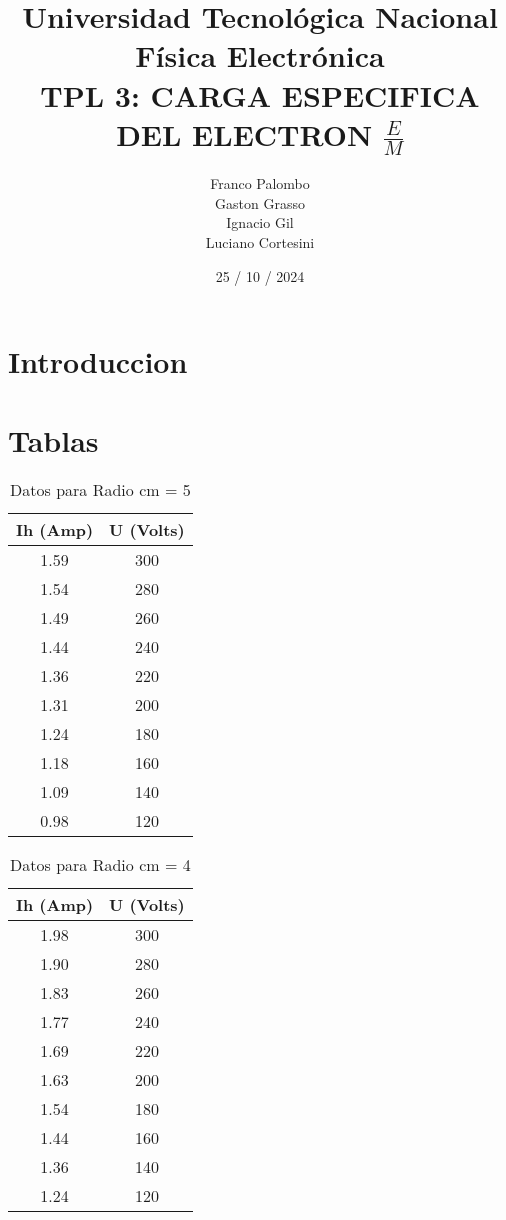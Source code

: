 \documentclass[a4paper,12pt]{report}
\title{
  \fontsize{25}{0}\selectfont Universidad Tecnológica Nacional \\
  \fontsize{22}{30}\selectfont Física Electrónica \\
  \fontsize{18}{25}\selectfont TPL 3: CARGA ESPECIFICA DEL ELECTRON $\frac{E}{M}$\\ 
}
\author{
Franco Palombo\\
Gaston Grasso\\
Ignacio Gil\\
Luciano Cortesini\\
}
\date{25 / 10 / 2024}
\begin{document}
\maketitle

\chapter{Introduccion}

\chapter{Tablas}

\begin{table}[h]
    \centering
    \begin{tabular}{|c|c|}
        \hline
        \textbf{Ih (Amp)} & \textbf{U (Volts)} \\ \hline
        1.59 & 300 \\ \hline
        1.54 & 280 \\ \hline
        1.49 & 260 \\ \hline
        1.44 & 240 \\ \hline
        1.36 & 220 \\ \hline
        1.31 & 200 \\ \hline
        1.24 & 180 \\ \hline
        1.18 & 160 \\ \hline
        1.09 & 140 \\ \hline
        0.98 & 120 \\ \hline
    \end{tabular}
    \caption{Datos para Radio cm = 5}
\end{table}

\begin{table}[h]
    \centering
    \begin{tabular}{|c|c|}
        \hline
        \textbf{Ih (Amp)} & \textbf{U (Volts)} \\ \hline
        1.98 & 300 \\ \hline
        1.90 & 280 \\ \hline
        1.83 & 260 \\ \hline
        1.77 & 240 \\ \hline
        1.69 & 220 \\ \hline
        1.63 & 200 \\ \hline
        1.54 & 180 \\ \hline
        1.44 & 160 \\ \hline
        1.36 & 140 \\ \hline
        1.24 & 120 \\ \hline
    \end{tabular}
    \caption{Datos para Radio cm = 4}
\end{table}
\end{document}

